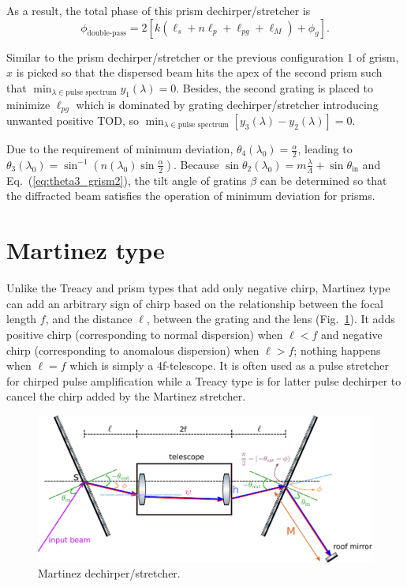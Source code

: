 \documentclass[12pt,hidelinks]{book}
\begin{document}
As a result, the total phase of this prism dechirper/stretcher is
\begin{equation}
\phi_{\text{double-pass}}=2\left[k\left(\ell_s+n\ell_p+\ell_{pg}+\ell_M\right)+\phi_g\right].
\end{equation}

Similar to the prism dechirper/stretcher or the previous configuration 1 of grism, $x$ is picked so that the dispersed beam hits the apex of the second prism such that $\min_{\lambda\in\text{pulse spectrum}} y_1(\lambda)=0$. Besides, the second grating is placed to minimize $\ell_{pg}$ which is dominated by grating dechirper/stretcher introducing unwanted positive TOD, so $\min_{\lambda\in\text{pulse spectrum}}\left[y_3(\lambda)-y_2(\lambda)\right]=0$.

Due to the requirement of minimum deviation, $\theta_4(\lambda_0)=\frac{\alpha}{2}$, leading to $\theta_3(\lambda_0)=\sin^{-1}(n(\lambda_0)\sin\frac{\alpha}{2})$. Because $\sin\theta_2(\lambda_0)=m\frac{\lambda}{\Lambda}+\sin\theta_{\text{in}}$ and Eq.~(\ref{eq:theta3_grism2}), the tilt angle of gratins $\beta$ can be determined so that the diffracted beam satisfies the operation of minimum deviation for prisms.

\section{Martinez type}
Unlike the Treacy and prism types that add only negative chirp, Martinez type can add an arbitrary sign of chirp based on the relationship between the focal length $f$, and the distance $\ell$, between the grating and the lens (Fig.~\ref{fig:martinez_stretcher}). It adds positive chirp (corresponding to normal dispersion) when $\ell<f$ and negative chirp (corresponding to anomalous dispersion) when $\ell>f$; nothing happens when $\ell=f$ which is simply a 4f-telescope. It is often used as a pulse stretcher for chirped pulse amplification while a Treacy type is for latter pulse dechirper to cancel the chirp added by the Martinez stretcher.

\begin{figure}[htbp]
\centering
\includegraphics[width=\textwidth]{Martinez stretcher.pdf}
\caption{Martinez dechirper/stretcher.}
\label{fig:martinez_stretcher}
\end{figure}
\end{document}
